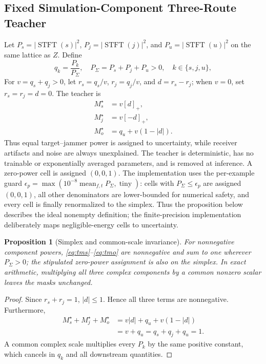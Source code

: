 \documentclass[letterpaper,journal]{IEEEtran}
\newcommand{\STFT}{\operatorname{STFT}}
\newtheorem{proposition}{Proposition}
\begin{document}
\subsection{Fixed Simulation-Component Three-Route Teacher}
Let $P_s=|\STFT(s)|^2$, $P_j=|\STFT(j)|^2$, and
$P_u=|\STFT(u)|^2$ on the same lattice as $Z$.  Define
\begin{equation}
q_k=\frac{P_k}{P_\Sigma},\quad
P_\Sigma=P_s+P_j+P_u>0,\quad
k\in\{s,j,u\},
\end{equation}
For $v=q_s+q_j>0$, let $r_s=q_s/v$, $r_j=q_j/v$, and $d=r_s-r_j$;
when $v=0$, set $r_s=r_j=d=0$.  The teacher is
\begin{align}
M_s^\star &= v[d]_+,\label{eq:tms}\\
M_j^\star &= v[-d]_+,\label{eq:tmj}\\
M_o^\star &= q_u+v(1-|d|).\label{eq:tmo}
\end{align}
Thus equal target--jammer power is assigned to uncertainty, while receiver
artifacts and noise are always unexplained.  The teacher is deterministic,
has no trainable or exponentially averaged parameters, and is removed at
inference.  A zero-power cell is assigned $(0,0,1)$.  The implementation uses
the per-example guard
\(\epsilon_p=\max(10^{-8}\operatorname{mean}_{f,t}P_\Sigma,
\operatorname{tiny})\): cells with \(P_\Sigma\leq\epsilon_p\) are assigned
\((0,0,1)\), all other denominators are lower-bounded for numerical safety,
and every cell is finally renormalized to the simplex.  Thus the proposition
below describes the ideal nonempty definition; the finite-precision
implementation deliberately maps negligible-energy cells to uncertainty.

\begin{proposition}[Simplex and common-scale invariance]
For nonnegative component powers, \eqref{eq:tms}--\eqref{eq:tmo} are
nonnegative and sum to one wherever $P_\Sigma>0$; the stipulated zero-power
assignment is also on the simplex.  In exact arithmetic, multiplying all
three complex components by a common nonzero scalar leaves the masks
unchanged.
\end{proposition}
\begin{proof}
Since $r_s+r_j=1$, $|d|\leq1$.  Hence all three terms are nonnegative.
Furthermore,
\begin{align*}
M_s^\star+M_j^\star+M_o^\star
&=v|d|+q_u+v(1-|d|)\\
&=v+q_u=q_s+q_j+q_u=1.
\end{align*}
A common complex scale multiplies every $P_k$ by the same positive constant,
which cancels in $q_k$ and all downstream quantities.
\end{proof}
\end{document}
